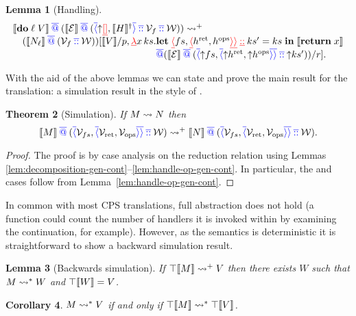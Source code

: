\documentclass[12pt,phd,lfcs,twoside,openright,logo,leftchapter,normalheadings]{infthesis}
\theoremstyle{plain}
\newtheorem{theorem}{Theorem}[chapter]
\newtheorem{lemma}[theorem]{Lemma}
\newtheorem{corollary}[theorem]{Corollary}
\theoremstyle{definition}
\begin{document}
\begin{lemma}[Handling]
    \[
   \bl
    \cps{\Do\;\ell\;V} \sapp (\cps{\EC} \sapp (\sRecord{\snil, \cps{H}^\dagger} \scons \sV_f \scons \sW)) \reducesto^+ \\
    \quad (\cps{N_\ell} \sapp (\sV_f \scons \sW))
    [\cps{V}/p, \dlam x\,\dhk.  \bl
    \Let\;\dRecord{\dlk, \dRecord{\vhret, \vhops}} \dcons \dhk' = \dhk \;\In\;\cps{\Return\;x}\\
    \sapp (\cps{\EC} \sapp (\sRecord{\reflect \dlk, \sRecord{\reflect \vhret, \reflect \vhops}} \scons \reflect\dhk'))/r]. \\
    \el \\
    \el
  \]
\end{lemma}

\medskip

With the aid of the above lemmas we can state and prove the main
result for the translation: a simulation result in the style of
\citet{Plotkin75}.
%
\begin{theorem}[Simulation]
  \label{thm:ho-simulation-gen-cont}
  If $M \leadsto N$ then
  \[
  \llbracket M \rrbracket \mathbin{{\color{blue}\overline{@}}} ({\color{blue}\overline{\langle}}\mathcal{V}_{fs}, {\color{blue}\overline{\langle}}\mathcal{V}_{\mathrm{ret}},\mathcal{V}_{\mathrm{ops}}{\color{blue}\overline{\rangle}}{\color{blue}\overline{\rangle}}
  \mathbin{{\color{blue}\overline{::}}} \mathcal{W}) \leadsto^+ \llbracket N \rrbracket \mathbin{{\color{blue}\overline{@}}} ({\color{blue}\overline{\langle}}\mathcal{V}_{fs},
    {\color{blue}\overline{\langle}}\mathcal{V}_{\mathrm{ret}},\mathcal{V}_{\mathrm{ops}}{\color{blue}\overline{\rangle}}{\color{blue}\overline{\rangle}} \mathbin{{\color{blue}\overline{::}}} \mathcal{W}).
  \]
\end{theorem}

\begin{proof}
  The proof is by case analysis on the reduction relation using Lemmas
  \ref{lem:decomposition-gen-cont}--\ref{lem:handle-op-gen-cont}. In
  particular, the  and  cases follow
  from Lemma~\ref{lem:handle-op-gen-cont}.
\end{proof}

In common with most CPS translations, full abstraction does not hold
(a function could count the number of handlers it is invoked within by
examining the continuation, for example). However, as the semantics is
deterministic it is straightforward to show a backward simulation
result.
%
\begin{lemma}[Backwards simulation]
  If $\top\llbracket M \rrbracket \leadsto^+ V$ then there exists $W$
  such that $M \leadsto^\ast W$ and $\top\llbracket W \rrbracket = V$.
\end{lemma}
%
\begin{corollary}
$M \leadsto^\ast V$ if and only if $\top\llbracket M \rrbracket \leadsto^\ast \top\llbracket V \rrbracket$.
\end{corollary}
\end{document}
